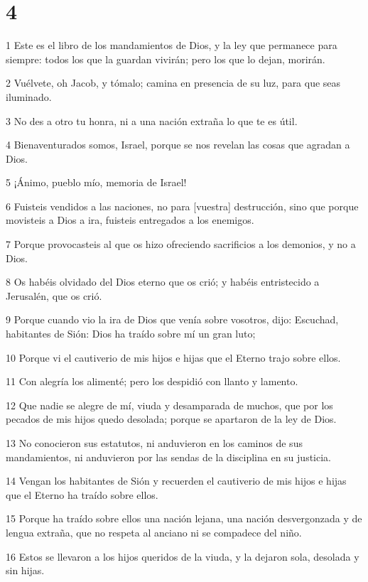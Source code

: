 \chapter{4}

\par 1 Este es el libro de los mandamientos de Dios, y la ley que permanece para siempre: todos los que la guardan vivirán; pero los que lo dejan, morirán.
\par 2 Vuélvete, oh Jacob, y tómalo; camina en presencia de su luz, para que seas iluminado.
\par 3 No des a otro tu honra, ni a una nación extraña lo que te es útil.
\par 4 Bienaventurados somos, Israel, porque se nos revelan las cosas que agradan a Dios.
\par 5 ¡Ánimo, pueblo mío, memoria de Israel!
\par 6 Fuisteis vendidos a las naciones, no para [vuestra] destrucción, sino que porque movisteis a Dios a ira, fuisteis entregados a los enemigos.
\par 7 Porque provocasteis al que os hizo ofreciendo sacrificios a los demonios, y no a Dios.
\par 8 Os habéis olvidado del Dios eterno que os crió; y habéis entristecido a Jerusalén, que os crió.
\par 9 Porque cuando vio la ira de Dios que venía sobre vosotros, dijo: Escuchad, habitantes de Sión: Dios ha traído sobre mí un gran luto;
\par 10 Porque vi el cautiverio de mis hijos e hijas que el Eterno trajo sobre ellos.
\par 11 Con alegría los alimenté; pero los despidió con llanto y lamento.
\par 12 Que nadie se alegre de mí, viuda y desamparada de muchos, que por los pecados de mis hijos quedo desolada; porque se apartaron de la ley de Dios.
\par 13 No conocieron sus estatutos, ni anduvieron en los caminos de sus mandamientos, ni anduvieron por las sendas de la disciplina en su justicia.
\par 14 Vengan los habitantes de Sión y recuerden el cautiverio de mis hijos e hijas que el Eterno ha traído sobre ellos.
\par 15 Porque ha traído sobre ellos una nación lejana, una nación desvergonzada y de lengua extraña, que no respeta al anciano ni se compadece del niño.
\par 16 Estos se llevaron a los hijos queridos de la viuda, y la dejaron sola, desolada y sin hijas.
